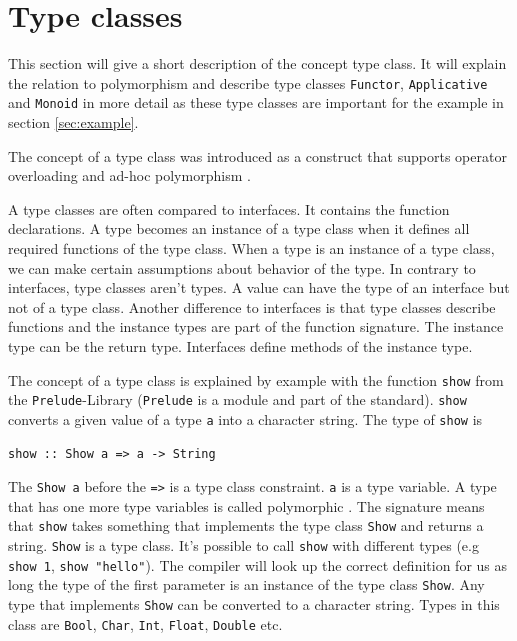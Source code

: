 
\section{Type classes}
\label{sec:typeclasses}

This section will give a short description of the concept type class. It will explain the relation to polymorphism and describe type classes \verb|Functor|, \verb|Applicative| and \verb|Monoid| in more detail as these type classes are important for the example in section \ref{sec:example}.

The concept of a type class was introduced as a construct that supports operator overloading and ad-hoc polymorphism \cite{Wadler}.

A type classes are often compared to interfaces. It contains the function declarations. A type becomes an instance of a type class when it defines all required functions of the type class. When a type is an instance of a type class, we can make certain assumptions about behavior of the type. In contrary to interfaces, type classes aren't types. A value can have the type of an interface but not of a type class. Another difference to interfaces is that type classes describe functions and the instance types are part of the function signature. The instance type can be the return type. Interfaces define methods of the instance type.

The concept of a type class is explained by example with the function \verb|show| from the \verb|Prelude|-Library (\verb|Prelude| is a module and part of the standard). \verb|show| converts a given value of a type \verb|a| into a character string. The type of \verb|show| is

\begin{verbatim}
show :: Show a => a -> String
\end{verbatim}

The \verb|Show a| before the \verb|=>| is a type class constraint. \verb|a| is a type variable. A type that has one more type variables is called polymorphic \cite{hutton}. The signature means that \verb|show| takes something that implements the type class \verb|Show| and returns a string. \verb|Show| is a type class. It's possible to call \verb|show| with different types (e.g \verb|show 1|, \verb|show "hello"|). The compiler will look up the correct definition for us as long the type of the first parameter is an instance of the type class \verb|Show|.  
Any type that implements \verb|Show| can be converted to a character string. Types in this class are \verb|Bool|, \verb|Char|, \verb|Int|, \verb|Float|, \verb|Double| etc.


